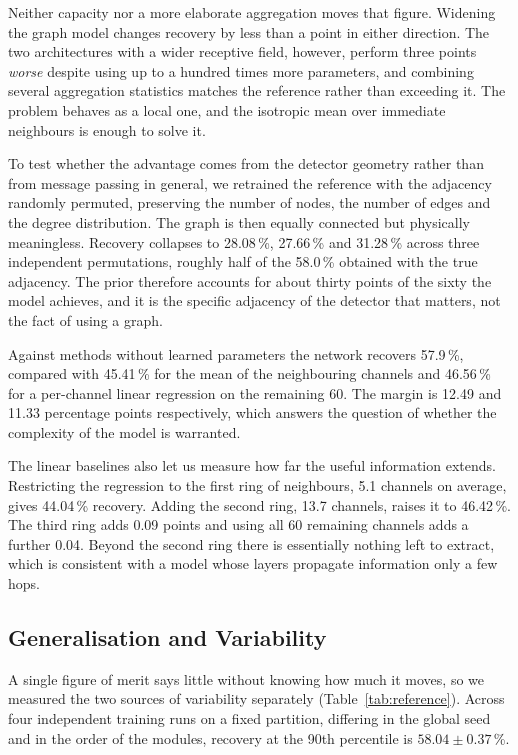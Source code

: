 \documentclass[10pt,conference]{IEEEtran}
\begin{document}
Neither capacity nor a more elaborate aggregation moves that figure. Widening
the graph model changes recovery by less than a point in either direction. The
two architectures with a wider receptive field, however, perform three points
\emph{worse} despite using up to a hundred times more parameters, and combining
several aggregation statistics matches the reference rather than exceeding it. The problem behaves as a local
one, and the isotropic mean over immediate neighbours is enough to solve it.

To test whether the advantage comes from the detector geometry rather than from
message passing in general, we retrained the reference with the adjacency
randomly permuted, preserving the number of nodes, the number of edges and the
degree distribution. The graph is then equally connected but physically
meaningless. Recovery collapses to 28.08\,\%, 27.66\,\% and 31.28\,\% across three
independent permutations, roughly half of the 58.0\,\% obtained with the true
adjacency. The prior therefore accounts for about thirty points of the sixty
the model achieves, and it is the specific adjacency of the detector that
matters, not the fact of using a graph.

Against methods without learned parameters the network recovers 57.9\,\%,
compared with 45.41\,\% for the mean of the neighbouring channels and
46.56\,\% for a per-channel linear regression on the remaining 60. The margin
is 12.49 and 11.33 percentage points respectively, which answers the question
of whether the complexity of the model is warranted.

The linear baselines also let us measure how far the useful information
extends. Restricting the regression to the first ring of neighbours, 5.1
channels on average, gives 44.04\,\% recovery. Adding the second ring, 13.7
channels, raises it to 46.42\,\%. The third ring adds 0.09 points and using all
60 remaining channels adds a further 0.04. Beyond the second ring there is
essentially nothing left to extract, which is consistent with a model whose
layers propagate information only a few hops.

\subsection{Generalisation and Variability}
\label{sec:res-variability}

A single figure of merit says little without knowing how much it moves, so we
measured the two sources of variability separately (Table~\ref{tab:reference}).
Across four independent training runs on a fixed partition, differing in the
global seed and in the order of the modules, recovery at the 90th percentile is
$58.04 \pm 0.37$\,\%.
\end{document}
